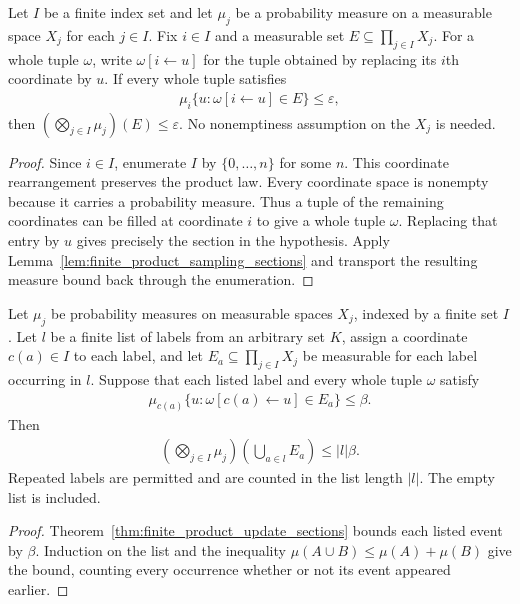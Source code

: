 \begin{theorem}
    \label{thm:finite_product_update_sections}
    \leanok
    Let $I$ be a finite index set and let $\mu_j$ be a probability
    measure on a measurable space $X_j$ for each $j\in I$.
    Fix $i\in I$ and a measurable set
    $E\subseteq\prod_{j\in I}X_j$. For a whole tuple $\omega$, write
    $\omega[i\leftarrow u]$ for the tuple obtained by replacing its
    $i$th coordinate by $u$. If every whole tuple satisfies
    \begin{align}
        \mu_i\{u:\omega[i\leftarrow u]\in E\}\le\varepsilon,
    \end{align}
    then $(\bigotimes_{j\in I}\mu_j)(E)\le\varepsilon$.
    No nonemptiness assumption on the $X_j$ is needed.
\end{theorem}
\begin{proof}\leanok
    Since $i\in I$, enumerate $I$ by $\{0,\ldots,n\}$ for some $n$.
    This coordinate rearrangement preserves the product law. Every
    coordinate space is nonempty because it carries a probability
    measure. Thus a tuple of the remaining coordinates can be filled
    at coordinate $i$ to give a whole tuple $\omega$. Replacing that
    entry by $u$ gives precisely the section in the hypothesis.
    Apply Lemma~\ref{lem:finite_product_sampling_sections} and transport
    the resulting measure bound back through the enumeration.
\end{proof}

\begin{theorem}
    \label{thm:finite_list_update_failures}
    \leanok
    Let $\mu_j$ be probability measures on measurable spaces $X_j$,
    indexed by a finite set $I$. Let $l$ be a finite list of labels
    from an arbitrary set $K$, assign a coordinate $c(a)\in I$ to
    each label, and let $E_a\subseteq\prod_{j\in I}X_j$ be measurable
    for each label occurring in $l$. Suppose that each listed label
    and every whole tuple $\omega$ satisfy
    \begin{align}
        \mu_{c(a)}\{u:\omega[c(a)\leftarrow u]\in E_a\}\le\beta.
    \end{align}
    Then
    \begin{align}
        \left(\bigotimes_{j\in I}\mu_j\right)
        \left(\bigcup_{a\in l}E_a\right)\le |l|\beta.
    \end{align}
    Repeated labels are permitted and are counted in the list length
    $|l|$. The empty list is included.
\end{theorem}
\begin{proof}\leanok
    Theorem~\ref{thm:finite_product_update_sections} bounds each listed
    event by $\beta$. Induction on the list and the inequality
    $\mu(A\cup B)\le\mu(A)+\mu(B)$ give the bound, counting every
    occurrence whether or not its event appeared earlier.
\end{proof}
